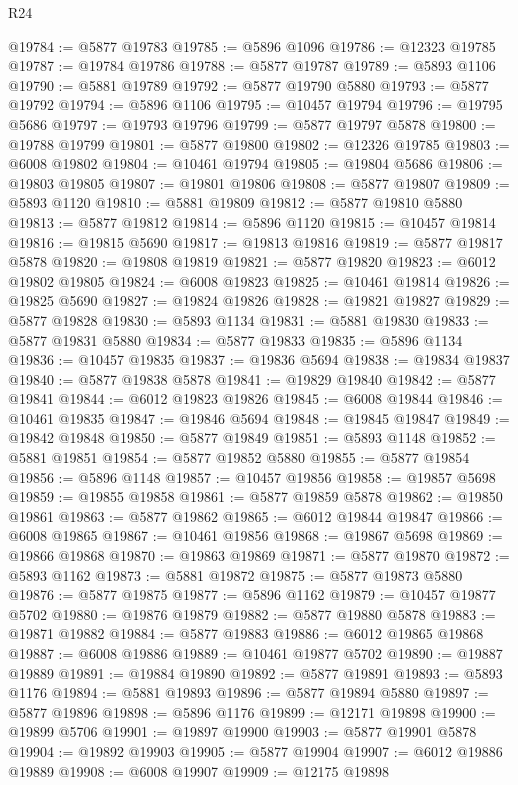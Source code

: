 \begin{lexlean}{R24}
\begin{coremodule}
@19784 := @5877 @19783
@19785 := @5896 @1096
@19786 := @12323 @19785
@19787 := @19784 @19786
@19788 := @5877 @19787
@19789 := @5893 @1106
@19790 := @5881 @19789
@19792 := @5877 @19790 @5880
@19793 := @5877 @19792
@19794 := @5896 @1106
@19795 := @10457 @19794
@19796 := @19795 @5686
@19797 := @19793 @19796
@19799 := @5877 @19797 @5878
@19800 := @19788 @19799
@19801 := @5877 @19800
@19802 := @12326 @19785
@19803 := @6008 @19802
@19804 := @10461 @19794
@19805 := @19804 @5686
@19806 := @19803 @19805
@19807 := @19801 @19806
@19808 := @5877 @19807
@19809 := @5893 @1120
@19810 := @5881 @19809
@19812 := @5877 @19810 @5880
@19813 := @5877 @19812
@19814 := @5896 @1120
@19815 := @10457 @19814
@19816 := @19815 @5690
@19817 := @19813 @19816
@19819 := @5877 @19817 @5878
@19820 := @19808 @19819
@19821 := @5877 @19820
@19823 := @6012 @19802 @19805
@19824 := @6008 @19823
@19825 := @10461 @19814
@19826 := @19825 @5690
@19827 := @19824 @19826
@19828 := @19821 @19827
@19829 := @5877 @19828
@19830 := @5893 @1134
@19831 := @5881 @19830
@19833 := @5877 @19831 @5880
@19834 := @5877 @19833
@19835 := @5896 @1134
@19836 := @10457 @19835
@19837 := @19836 @5694
@19838 := @19834 @19837
@19840 := @5877 @19838 @5878
@19841 := @19829 @19840
@19842 := @5877 @19841
@19844 := @6012 @19823 @19826
@19845 := @6008 @19844
@19846 := @10461 @19835
@19847 := @19846 @5694
@19848 := @19845 @19847
@19849 := @19842 @19848
@19850 := @5877 @19849
@19851 := @5893 @1148
@19852 := @5881 @19851
@19854 := @5877 @19852 @5880
@19855 := @5877 @19854
@19856 := @5896 @1148
@19857 := @10457 @19856
@19858 := @19857 @5698
@19859 := @19855 @19858
@19861 := @5877 @19859 @5878
@19862 := @19850 @19861
@19863 := @5877 @19862
@19865 := @6012 @19844 @19847
@19866 := @6008 @19865
@19867 := @10461 @19856
@19868 := @19867 @5698
@19869 := @19866 @19868
@19870 := @19863 @19869
@19871 := @5877 @19870
@19872 := @5893 @1162
@19873 := @5881 @19872
@19875 := @5877 @19873 @5880
@19876 := @5877 @19875
@19877 := @5896 @1162
@19879 := @10457 @19877 @5702
@19880 := @19876 @19879
@19882 := @5877 @19880 @5878
@19883 := @19871 @19882
@19884 := @5877 @19883
@19886 := @6012 @19865 @19868
@19887 := @6008 @19886
@19889 := @10461 @19877 @5702
@19890 := @19887 @19889
@19891 := @19884 @19890
@19892 := @5877 @19891
@19893 := @5893 @1176
@19894 := @5881 @19893
@19896 := @5877 @19894 @5880
@19897 := @5877 @19896
@19898 := @5896 @1176
@19899 := @12171 @19898
@19900 := @19899 @5706
@19901 := @19897 @19900
@19903 := @5877 @19901 @5878
@19904 := @19892 @19903
@19905 := @5877 @19904
@19907 := @6012 @19886 @19889
@19908 := @6008 @19907
@19909 := @12175 @19898

\end{coremodule}
\end{lexlean}
